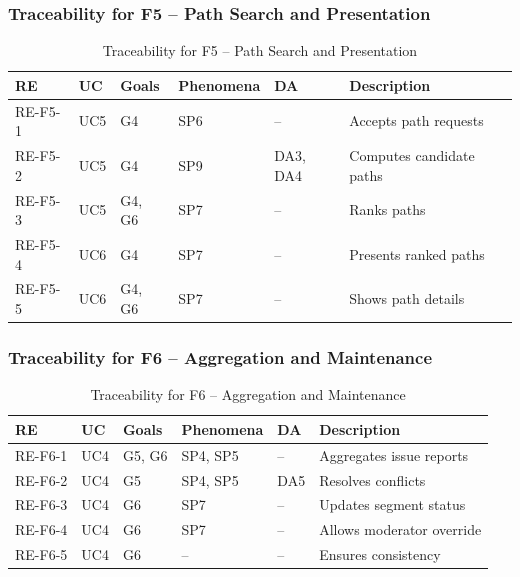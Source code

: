 \subsubsection{Traceability for F5 -- Path Search and Presentation}

\begin{table}[H]
\centering
\caption{Traceability for F5 -- Path Search and Presentation}
\label{tab:trace_f5}
  \begin{tabular}{@{}p{1.6cm}p{2cm}p{2.5cm}p{2.2cm}p{1cm}p{4cm}@{}}
  \toprule
  \textbf{RE} & \textbf{UC} & \textbf{Goals} & \textbf{Phenomena} & \textbf{DA} & \textbf{Description} \\
  \midrule
  RE-F5-1 & UC5 & G4 & SP6 & -- & Accepts path requests \\
  RE-F5-2 & UC5 & G4 & SP9 & DA3, DA4 & Computes candidate paths \\
  RE-F5-3 & UC5 & G4, G6 & SP7 & -- & Ranks paths \\
  RE-F5-4 & UC6 & G4 & SP7 & -- & Presents ranked paths \\
  RE-F5-5 & UC6 & G4, G6 & SP7 & -- & Shows path details \\
  \bottomrule
  \end{tabular}
\end{table}


\subsubsection{Traceability for F6 -- Aggregation and Maintenance}

\begin{table}[H]
\centering
\caption{Traceability for F6 -- Aggregation and Maintenance}
\label{tab:trace_f6}
  \begin{tabular}{@{}p{1.6cm}p{2cm}p{2.5cm}p{2.2cm}p{1cm}p{4cm}@{}}
  \toprule
  \textbf{RE} & \textbf{UC} & \textbf{Goals} & \textbf{Phenomena} & \textbf{DA} & \textbf{Description} \\
  \midrule
  RE-F6-1 & UC4 & G5, G6 & SP4, SP5 & -- & Aggregates issue reports \\
  RE-F6-2 & UC4 & G5 & SP4, SP5 & DA5 & Resolves conflicts \\
  RE-F6-3 & UC4 & G6 & SP7 & -- & Updates segment status \\
  RE-F6-4 & UC4 & G6 & SP7 & -- & Allows moderator override \\
  RE-F6-5 & UC4 & G6 & -- & -- & Ensures consistency \\
  \bottomrule
  \end{tabular}
\end{table}



